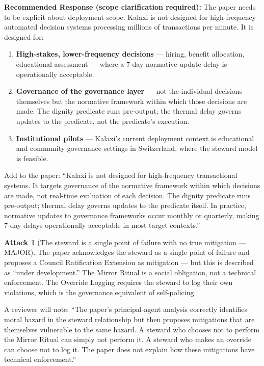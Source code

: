 \documentclass[12pt,a4paper]{article}
\theoremstyle{definition}
\newtheorem{attack}{Attack}[section]
\begin{document}
\begin{mdframed}[style=defenseframe]
\textbf{Recommended Response (scope clarification required):}
The paper needs to be explicit about deployment scope. Kalaxi is not designed
for high-frequency automated decision systems processing millions of transactions
per minute. It is designed for:

\begin{enumerate}
\item \textbf{High-stakes, lower-frequency decisions} — hiring, benefit
  allocation, educational assessment — where a 7-day normative update delay
  is operationally acceptable.
\item \textbf{Governance of the governance layer} — not the individual decisions
  themselves but the normative framework within which those decisions are made.
  The dignity predicate runs pre-output; the thermal delay governs updates to
  the predicate, not the predicate's execution.
\item \textbf{Institutional pilots} — Kalaxi's current deployment context is
  educational and community governance settings in Switzerland, where the
  steward model is feasible.
\end{enumerate}

Add to the paper: ``Kalaxi is not designed for high-frequency transactional
systems. It targets governance of the normative framework within which
decisions are made, not real-time evaluation of each decision. The dignity
predicate runs pre-output; thermal delay governs updates to the predicate
itself. In practice, normative updates to governance frameworks occur
monthly or quarterly, making 7-day delays operationally acceptable in
most target contexts.''
\end{mdframed}

\begin{attack}[The steward is a single point of failure with no true mitigation — MAJOR]
\label{att:steward}
The paper acknowledges the steward as a single point of failure and proposes a
Council Ratification Extension as mitigation — but this is described as ``under
development.'' The Mirror Ritual is a social obligation, not a technical
enforcement. The Override Logging requires the steward to log their own
violations, which is the governance equivalent of self-policing.

A reviewer will note: ``The paper's principal-agent analysis correctly identifies
moral hazard in the steward relationship but then proposes mitigations that are
themselves vulnerable to the same hazard. A steward who chooses not to perform
the Mirror Ritual can simply not perform it. A steward who makes an override can
choose not to log it. The paper does not explain how these mitigations have
technical enforcement.''
\end{attack}
\end{document}
